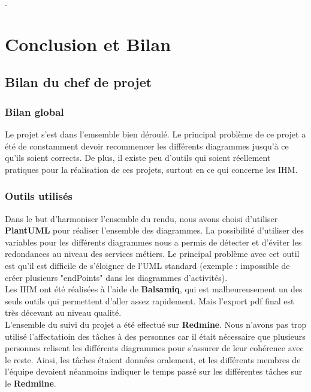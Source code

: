 .

\chapter*{Conclusion et Bilan}
\setcounter{section}{0}


\section*{Bilan du chef de projet}

\subsection*{Bilan global}
Le projet s'est dans l'emsemble bien déroulé. Le principal problème de ce projet a été de constamment devoir recommencer les différents diagrammes jusqu'à ce qu'ils soient corrects. De plus, il existe peu d'outils qui soient réellement pratiques pour la réalisation de ces projets, surtout en ce qui concerne les IHM.

\subsection*{Outils utilisés}
Dans le but d'harmoniser l'ensemble du rendu, nous avons choisi d'utiliser \textbf{PlantUML} pour réaliser l'ensemble des diagrammes. La possibilité d'utiliser des variables pour les différents diagrammes nous a permis de détecter et d'éviter les redondances au niveau des services métiers. Le principal problème avec cet outil est qu'il est difficile de s'éloigner de l'UML standard (exemple : impossible de créer plusieurs "endPoints" dans les diagrammes d'activités).\\

Les IHM ont été réalisées à l'aide de \textbf{Balsamiq}, qui est malheureusement un des seuls outils qui permettent d'aller assez rapidement. Mais l'export pdf final est très décevant au niveau qualité. \\

L'ensemble du suivi du projet a été effectué sur \textbf{Redmine}. Nous n'avons pas trop utilisé l'affectatioin des tâches à des personnes car il était nécessaire que plusieurs personnes relisent les différents diagrammes pour s'assurer de leur cohérence avec le reste. Ainsi, les tâches étaient données oralement, et les différents membres de l'équipe devaient néanmoins indiquer le temps passé sur les différentes tâches sur le \textbf{Redmiine}.

